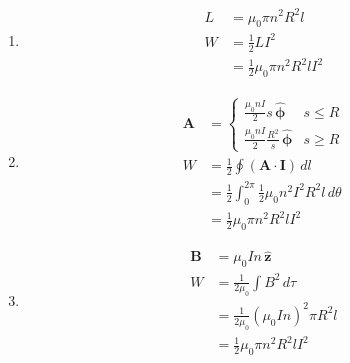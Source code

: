 \documentclass{article}
\renewcommand{\vec}[1]{\boldsymbol{\mathbf{#1}}}
\newcommand{\uvec}[1]{\hat{\vec{#1}}}
\begin{document}
\begin{enumerate}
  \item

        \begin{align*}
          L & = \mu_0 \pi n^2 R^2 l                 \\
          W & = \frac{1}{2} L I^2                   \\
            & = \frac{1}{2} \mu_0 \pi n^2 R^2 l I^2
        \end{align*}

  \item

        \begin{align*}
          \vec{A} & = \begin{cases}
                        \frac{\mu_0 n I}{2} s \,\uvec{\phi}             & s \le R \\
                        \frac{\mu_0 n I}{2} \frac{R^2}{s} \,\uvec{\phi} & s \ge R
                      \end{cases}             \\
          W       & = \frac{1}{2} \oint (\vec{A} \cdot \vec{I}) \,d l                       \\
                  & = \frac{1}{2} \int_0^{2 \pi} \frac{1}{2} \mu_0 n^2 I^2 R^2 l \,d \theta \\
                  & = \frac{1}{2} \mu_0 \pi n^2 R^2 l I^2
        \end{align*}

  \item

        \begin{align*}
          \vec{B} & = \mu_0 I n \,\uvec{z}                      \\
          W       & = \frac{1}{2 \mu_0} \int B^2 \,d \tau       \\
                  & = \frac{1}{2 \mu_0} (\mu_0 I n)^2 \pi R^2 l \\
                  & = \frac{1}{2} \mu_0 \pi n^2 R^2 l I^2
        \end{align*}
\end{enumerate}

\subsection{}
\end{document}
